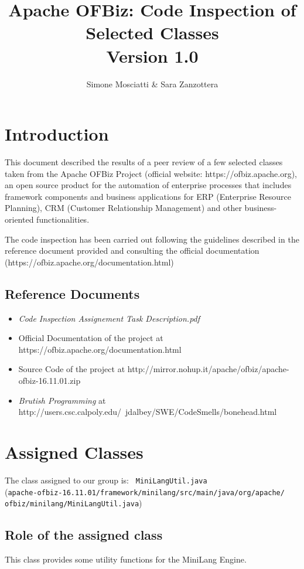 \documentclass[11pt]{article} %
\title{Apache OFBiz: Code Inspection of Selected Classes \\ {\Large Version 1.0}}
\author{Simone Mosciatti \& Sara Zanzottera}
\begin{document}
\maketitle
\newpage
\tableofcontents
\newpage

\section{Introduction}
This document described the results of a peer review of a few selected classes taken from the Apache OFBiz Project (official website: https://ofbiz.apache.org), an open source product for the automation of enterprise processes that includes framework components and business applications for ERP (Enterprise Resource Planning), CRM (Customer Relationship Management) and other business-oriented functionalities.
 
The code inspection has been carried out following the guidelines described in the reference document provided and consulting the official documentation \\ (https://ofbiz.apache.org/documentation.html) 

\subsection{Reference Documents}
\begin{itemize}
	\item \textit{Code Inspection Assignement Task Description.pdf}
	\item Official Documentation of the project at https://ofbiz.apache.org/documentation.html
	\item Source Code of the project at http://mirror.nohup.it/apache/ofbiz/apache-ofbiz-16.11.01.zip
	\item \textit{Brutish Programming} at 
http://users.csc.calpoly.edu/~jdalbey/SWE/CodeSmells/bonehead.html
\end{itemize}


\section{Assigned Classes}

The class assigned to our group is:  \texttt{ {\large MiniLangUtil.java} }  \hfill\\
(\texttt{apache-ofbiz-16.11.01/framework/minilang/src/main/java/org/apache/ \\ 
ofbiz/minilang/MiniLangUtil.java})

\subsection{Role of the assigned class}
This class provides some utility functions for the MiniLang Engine.
\end{document}
